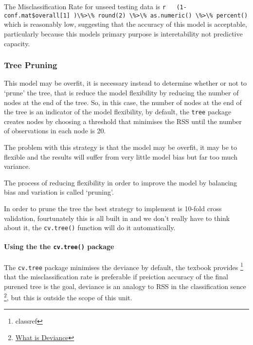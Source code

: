 \documentclass[12pt]{article}
\newcommand{\passthrough}[1]{#1}
\begin{document}
The Misclassification Rate for unseed testing data is
\passthrough{\lstinline!r   (1-conf.mat$overall[1] )\%>\% round(2) \%>\% as.numeric() \%>\% percent()!}
which is reasonably low, suggesting that the accuracy of this model is
acceptable, particularly because this models primary purpose is
interetability not predictive capacity.

\hypertarget{tree-pruning}{%
\subsubsection{Tree Pruning}\label{tree-pruning}}

This model may be overfit, it is necessary instead to determine whether
or not to `prune' the tree, that is reduce the model flexibility by
reducing the number of nodes at the end of the tree. So, in this case,
the number of nodes at the end of the tree is an indicator of the model
flexibility, by default, the \passthrough{\lstinline!tree!} package
creates nodes by choosing a threshold that minimises the RSS until the
number of observations in each node is 20.

The problem with this strategy is that the model may be overfit, it may
be to flexible and the results will suffer from very little model bias
but far too much variance.

The process of reducing flexibility in order to improve the model by
balancing bias and variation is called `pruning'.

In order to prune the tree the best strategy to implement is 10-fold
cross validation, fourtunately this is all built in and we don't really
have to think about it, the \passthrough{\lstinline!cv.tree()!} function
will do it automatically.

\hypertarget{using-the-the-cv.tree-package}{%
\paragraph{\texorpdfstring{Using the the \texttt{cv.tree()}
package}{Using the the cv.tree() package}}\label{using-the-the-cv.tree-package}}

The \passthrough{\lstinline!cv.tree!} package minimises the deviance by
default, the texbook provides \footnote{classref} that the
misclassification rate is preferable if preiction accuracy of the final
purened tree is the goal, deviance is an analogy to RSS in the
classification sence \footnote{\href{https://stats.stackexchange.com/a/6610}{What
  is Deviance}}, but this is outside the scope of this unit.
\end{document}
